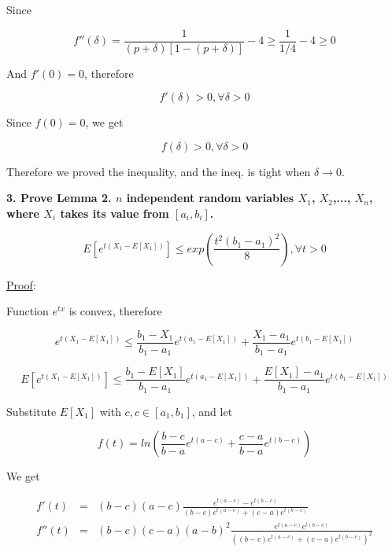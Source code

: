 \documentclass[UTF8]{ctexart}
\begin{document}
Since\par
\begin{equation*}
f''(\delta)=\frac{1}{(p+\delta)[1-(p+\delta)]}-4\geq\frac{1}{1/4}-4\geq 0
\end{equation*}\par
And $f'(0)=0$, therefore\par
\begin{equation*}
f'(\delta)>0,\forall\delta>0
\end{equation*}\par
Since $f(0)=0$, we get\par
\begin{equation*}
f(\delta)>0,\forall\delta>0
\end{equation*}\par
Therefore we proved the inequality, and the ineq. is tight when $\delta\to 0$.\par
\textbf{3. Prove Lemma 2. $n$ independent random variables $X_{1}$, $X_{2}$,..., $X_{n}$, where $X_{i}$ takes its value from $[a_{i}, b_{i}]$.}\par
\begin{equation*}
E[e^{t(X_{1}-E[X_{1}])}]\leq exp(\frac{t^{2}(b_{1}-a_{1})^{2}}{8}),\forall t>0
\end{equation*}\par
\uline{Proof}:\par
Function $e^{tx}$ is convex, therefore\par
\begin{equation*}
e^{t(X_{1}-E[X_{1}])}\leq\frac{b_{1}-X_{1}}{b_{1}-a_{1}}e^{t(a_{1}-E[X_{1}])}+\frac{X_{1}-a_{1}}{b_{1}-a_{1}}e^{t(b_{1}-E[X_{1}])}
\end{equation*}\par
\begin{equation*}
E[e^{t(X_{1}-E[X_{1}])}]\leq\frac{b_{1}-E[X_{1}]}{b_{1}-a_{1}}e^{t(a_{1}-E[X_{1}])}+\frac{E[X_{1}]-a_{1}}{b_{1}-a_{1}}e^{t(b_{1}-E[X_{1}])}
\end{equation*}\par
Substitute $E[X_{1}]$ with $c, c\in[a_{1}, b_{1}]$, and let \par
\begin{equation*}
f(t)=ln(\frac{b-c}{b-a}e^{t(a-c)}+\frac{c-a}{b-a}e^{t(b-c)})
\end{equation*}\par
We get\par
\begin{eqnarray*}
f'(t)&=&(b-c)(a-c)\frac{e^{t(a-c)}-e^{t(b-c)}}{(b-c)e^{t(a-c)}+(c-a)e^{t(b-c)}}\\
f''(t)&=&(b-c)(c-a)(a-b)^{2}\frac{e^{t(a-c)}e^{t(b-c)}}{((b-c)e^{t(a-c)}+(c-a)e^{t(b-c)})^{2}}
\end{eqnarray*}\par
\end{document}
